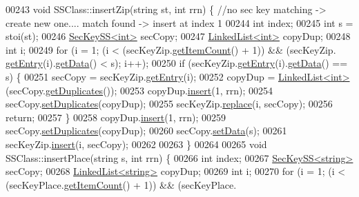 \begin{DoxyCode}
00243 \textcolor{keywordtype}{void} SSClass::insertZip(\textcolor{keywordtype}{string} st, \textcolor{keywordtype}{int} rrn) \{                \textcolor{comment}{//no sec key matching -> create new one....   
       match found -> insert at index 1}
00244     \textcolor{keywordtype}{int} index;
00245     \textcolor{keywordtype}{int} s = stoi(st);
00246     \hyperlink{classSecKeySS}{SecKeySS<int>} secCopy;
00247     \hyperlink{classLinkedList}{LinkedList<int>} copyDup;
00248         \textcolor{keywordtype}{int} i;
00249     \textcolor{keywordflow}{for} (i = 1; (i < (secKeyZip.\hyperlink{classLinkedList_afc6635f854f48f2f126cf3b60d845220}{getItemCount}() + 1)) && (secKeyZip.
      \hyperlink{classLinkedList_a341bfd7772c9d24d29eb7a7f3936915b}{getEntry}(i).\hyperlink{classSecKeySS_a9fdb8a771250b7aaab556f019b381eab}{getData}() < s); i++);
00250     \textcolor{keywordflow}{if} (secKeyZip.\hyperlink{classLinkedList_a341bfd7772c9d24d29eb7a7f3936915b}{getEntry}(i).\hyperlink{classSecKeySS_a9fdb8a771250b7aaab556f019b381eab}{getData}() == s) \{
00251         secCopy = secKeyZip.\hyperlink{classLinkedList_a341bfd7772c9d24d29eb7a7f3936915b}{getEntry}(i);
00252         copyDup = \hyperlink{classLinkedList}{LinkedList<int>}(secCopy.\hyperlink{classSecKeySS_abef7c9c03e9bc6b818d599966428fdec}{getDuplicates}());
00253         copyDup.\hyperlink{classLinkedList_ae8a19375505e87e2e4fc0e9b5afe4d4d}{insert}(1, rrn);
00254         secCopy.\hyperlink{classSecKeySS_a95fdde8fc0b590359692784d15481dd4}{setDuplicates}(copyDup);
00255         secKeyZip.\hyperlink{classLinkedList_a3035f880c50e7d8f68e67c093d4607ca}{replace}(i, secCopy);
00256         \textcolor{keywordflow}{return};
00257     \}
00258     copyDup.\hyperlink{classLinkedList_ae8a19375505e87e2e4fc0e9b5afe4d4d}{insert}(1, rrn);
00259     secCopy.\hyperlink{classSecKeySS_a95fdde8fc0b590359692784d15481dd4}{setDuplicates}(copyDup);
00260     secCopy.\hyperlink{classSecKeySS_ae893fbaf619bf61f73f1585ae5686609}{setData}(s);
00261     secKeyZip.\hyperlink{classLinkedList_ae8a19375505e87e2e4fc0e9b5afe4d4d}{insert}(i, secCopy);
00262 
00263 \}
00264 
00265 \textcolor{keywordtype}{void} SSClass::insertPlace(\textcolor{keywordtype}{string} s, \textcolor{keywordtype}{int} rrn) \{
00266     \textcolor{keywordtype}{int} index;
00267     \hyperlink{classSecKeySS}{SecKeySS<string>} secCopy;
00268     \hyperlink{classLinkedList}{LinkedList<string>} copyDup;
00269         \textcolor{keywordtype}{int} i;
00270     \textcolor{keywordflow}{for} (i = 1; (i < (secKeyPlace.\hyperlink{classLinkedList_afc6635f854f48f2f126cf3b60d845220}{getItemCount}() + 1)) && (secKeyPlace.

\end{DoxyCode}
